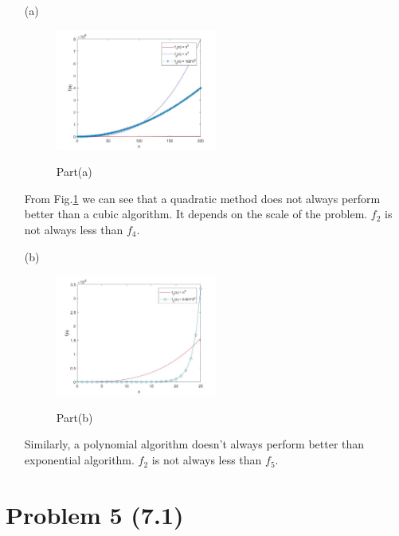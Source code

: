 \documentclass[12pt]{article}
\begin{document}
\begin{enumerate}
\item [(a)]

\begin{figure}[htbp]
  \caption{Part(a)}
  \centering
    \includegraphics[width=0.5\textwidth]{part_a.jpg}
    \label{part_a}
\end{figure}

From Fig.\ref{part_a} we can see that a quadratic method does not always perform better than a cubic algorithm. It depends on the scale of the problem. $f_2$ is not always less than $f_4$.

\item [(b)]

\begin{figure}[htbp]
  \caption{Part(b)}
  \centering
    \includegraphics[width=0.5\textwidth]{part_b.jpg}
    \label{part_b}
\end{figure}

Similarly, a polynomial algorithm doesn't always perform better than exponential algorithm. $f_2$ is not always less than $f_5$.

\end{enumerate}





\section*{Problem 5 (7.1)}
\end{document}
